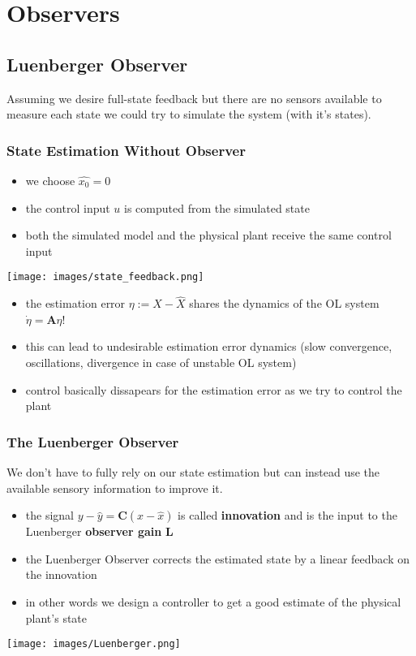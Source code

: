 \section{Observers}
\subsection{Luenberger Observer}
Assuming we desire full-state feedback but there are no sensors available to measure each state we could try to simulate the system (with it's states).
\subsubsection{State Estimation Without Observer}
\begin{itemize}
    \item we choose $\hat{x_0}=0$
    \item the control input $u$ is computed from the simulated state
    \item both the simulated model and the physical plant receive the same control input
\end{itemize}
\begin{center}
    \texttt{[image: images/state\_feedback.png]}\\
\end{center}

\begin{itemize}
    \item the estimation error $\eta:=X-\hat{X}$ shares the dynamics of the OL system $\dot{\eta}=\mathbf{A}\eta$!
    \item this can lead to undesirable estimation error dynamics (slow convergence, oscillations, divergence in case of unstable OL system)
    \item control basically dissapears for the estimation error as we try to control the plant
\end{itemize}

\subsubsection{The Luenberger Observer}
We don't have to fully rely on our state estimation but can instead use the available sensory information to improve it.
\begin{itemize}
    \item the signal $y-\hat{y}=\mathbf{C}(x-\hat{x})$ is called \textbf{innovation} and is the input to the Luenberger \textbf{observer gain} $\mathbf{L}$
    \item the Luenberger Observer corrects the estimated state by a linear feedback on the innovation
    \item in other words we design a controller to get a good estimate of the physical plant's state
\end{itemize}
\begin{center}
    \texttt{[image: images/Luenberger.png]}
\end{center}

